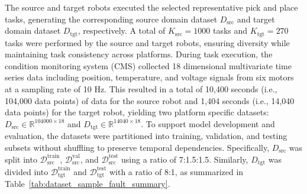 \documentclass[a4paper,10pt]{cas-sc}%
\begin{document}
The source and target robots executed the selected representative pick and place tasks, generating the corresponding source domain dataset \( D_{\text{src}} \) and target domain dataset \( D_{\text{tgt}} \), respectively. A total of $K_{\text{src}}=1000$ tasks and $K_{\text{tgt}}=270$ tasks were performed by the source and target robots, ensuring diversity while maintaining task consistency across platforms. During task execution, the condition monitoring system (CMS) collected 18 dimensional multivariate time series data including position, temperature, and voltage signals from six motors at a sampling rate of 10 Hz. This resulted in a total of 10,400 seconds (i.e., 104,000 data points) of data for the source robot and 1,404 seconds (i.e., 14,040 data points) for the target robot, yielding two platform specific datasets: $D_{\mathrm{src}}\in\mathbb{R}^{104000\times18}$ and $D_{\mathrm{tgt}}\in\mathbb{R}^{14040\times18}$. To support model development and evaluation, the datasets were partitioned into training, validation, and testing subsets without shuffling to preserve temporal dependencies. Specifically, $D_{\mathrm{src}}$ was split into $\mathcal{D}_{\mathrm{src}}^{\mathrm{train}}$, $\mathcal{D}_{\mathrm{src}}^{\mathrm{val}}$, and $\mathcal{D}_{\mathrm{src}}^{\mathrm{test}}$ using a ratio of 7:1.5:1.5. Similarly, $D_{\mathrm{tgt}}$ was divided into $\mathcal{D}_{\mathrm{tgt}}^{\mathrm{train}}$ and $\mathcal{D}_{\mathrm{tgt}}^{\mathrm{test}}$ with a ratio of 8:1, as summarized in Table~\ref{tab:dataset_sample_fault_summary}.
\end{document}
